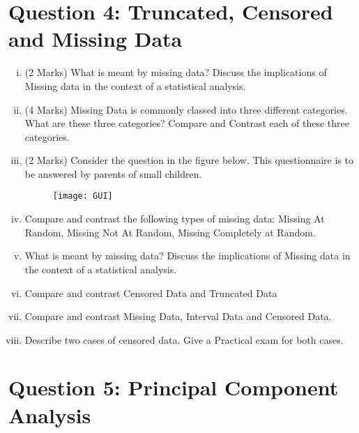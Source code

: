 \documentclass{article}
\begin{document}
\newpage
\section*{Question 4: Truncated, Censored and Missing Data}

\begin{enumerate}[(i)]
	\item (2 Marks) What is meant by missing data? Discuss the implications of Missing data in the context of a statistical analysis.
	\item (4 Marks) Missing Data is commonly classed into three different categories. What are these three categories? Compare and Contrast each of these three categories.
	
	\item (2 Marks) Consider the question in the figure below. This questionnaire is to be answered by parents of small children. 
	
\begin{figure}[h!]
\centering
\texttt{[image: GUI]}
\caption{}
\label{fig:GUI}
\end{figure}
	\item Compare and contrast the following types of missing data: Missing At Random, Missing
	Not At Random, Missing Completely at Random.
	
	\item What is meant by missing data? Discuss the implications of Missing data in the context of a statistical analysis.
	\item Compare and contrast Censored Data and Truncated Data
	\item Compare and contrast Missing Data, Interval Data and Censored Data.
	\item Describe two cases of censored data. Give a Practical exam for both cases.
\end{enumerate}



\newpage
\section*{Question 5: Principal Component Analysis}
\end{document}
